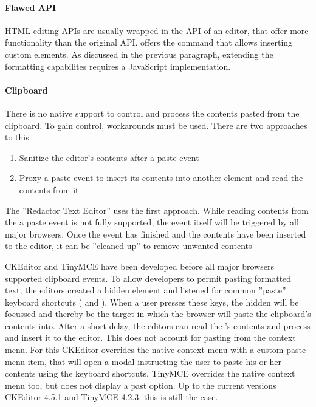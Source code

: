 \paragraph{Flawed API} HTML editing APIs are usually wrapped in the API of an editor, that offer more functionality than the original API.  offers the  command that allows inserting custom elements. As discussed in the previous paragraph, extending the formatting capabilites requires a JavaScript implementation.

\paragraph{Clipboard} There is no native support to control and process the contents pasted from the clipboard. To gain control, workarounds must be used. There are two approaches to this

\begin{enumerate}
\item Sanitize the editor's contents after a paste event
\item Proxy a paste event to insert its contents into another element and read the contents from it
\end{enumerate}

The ''Redactor Text Editor'' uses the first approach. While reading contents from the a paste event is not fully supported, the event itself will be triggered by all major browsers. Once the event has finished and the contents have been inserted to the editor, it can be ''cleaned up'' to remove unwanted contents

CKEditor and TinyMCE have been developed before all major browsers supported clipboard events. To allow developers to permit pasting formatted text, the editors created a hidden  element and listened for common ''paste'' keyboard shortcuts ( and ). When a user presses these keys, the hidden  will be focussed and thereby be the target in which the browser will paste the clipboard's contents into. After a short delay, the editors can read the 's contents and process and insert it to the editor. This does not account for pasting from the context menu. For this CKEditor overrides the native context menu with a custom paste menu item, that will open a modal instructing the user to paste his or her contents using the keyboard shortcuts. TinyMCE overrides the native context menu too, but does not display a past option. Up to the current versions CKEditor 4.5.1 and TinyMCE 4.2.3, this is still the case.

